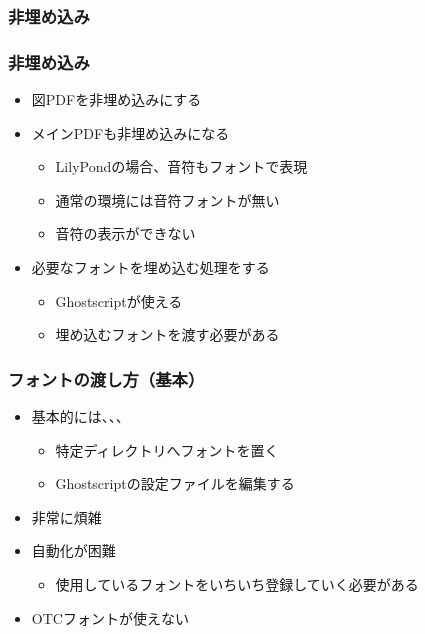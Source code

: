 \documentclass[unicode,17pt]{beamer}
\begin{document}
\subsubsection{非埋め込み}
\begin{frame}\frametitle{非埋め込み}
  \begin{itemize}
  \item 図PDFを非埋め込みにする
  \end{itemize}
  \centering
  \begin{itemize}
  \item メインPDFも非埋め込みになる
    \begin{itemize}
    \item LilyPondの場合、音符もフォントで表現
    \item 通常の環境には音符フォントが無い
    \item 音符の表示ができない
    \end{itemize}
  \item 必要なフォントを埋め込む処理をする
    \begin{itemize}
    \item Ghostscriptが使える
    \item 埋め込むフォントを渡す必要がある
    \end{itemize}
  \end{itemize}
\end{frame}

\begin{frame}\frametitle{フォントの渡し方（基本）}
  \begin{itemize}
  \item 基本的には、、、
    \begin{itemize}
    \item 特定ディレクトリへフォントを置く
    \item Ghostscriptの設定ファイルを編集する
    \end{itemize}
  \item 非常に煩雑
  \item 自動化が困難
    \begin{itemize}
    \item 使用しているフォントをいちいち登録していく必要がある
    \end{itemize}
  \item OTCフォントが使えない
  \end{itemize}
\end{frame}
\end{document}

